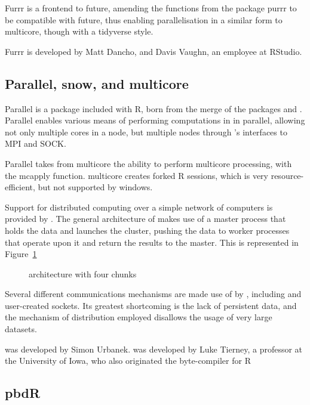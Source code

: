 Furrr is a frontend to future, amending the functions from the package
purrr to be compatible with future, thus enabling parallelisation in a
similar form to multicore, though with a tidyverse
style\cite{vaughan18}.

Furrr is developed by Matt Dancho, and Davis Vaughn, an employee at
RStudio.

\hypertarget{sec:parall-snow-mult}{%
    \subsection{Parallel, snow, and multicore}\label{sec:parall-snow-mult}}

Parallel is a package included with R, born from the merge of the
packages  and \cite{core:_packag}. Parallel enables
various means of performing computations in \R in parallel, allowing not
only multiple cores in a node, but multiple nodes through 's
interfaces to MPI and SOCK\cite{tierney18}.

Parallel takes from multicore the ability to perform multicore
processing, with the mcapply function. multicore creates forked R
sessions, which is very resource-efficient, but not supported by
windows.

Support for distributed computing over a simple network of computers is provided by .
The general architecture of  makes use of a master process that holds the data and launches the cluster, pushing the data to worker processes that operate upon it and return the results to the master.
This is represented in Figure~\cref{fig:snow}

\begin{figure}[H]

\caption{\label{fig:snow} architecture with four chunks}
\end{figure}

Several different communications mechanisms are made use of by , including  and user-created sockets.
Its greatest shortcoming is the lack of persistent data, and the mechanism of distribution employed disallows the usage of very large datasets.

 was developed by Simon Urbanek.  was developed by Luke
Tierney, a professor at the University of Iowa, who also originated the
byte-compiler for R

\hypertarget{pbdr}{%
    \subsection{pbdR}\label{pbdr}}


